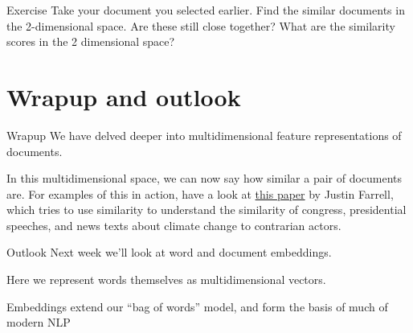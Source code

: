 \documentclass[
  10pt,
  ignorenonframetext,
  aspectratio=169]{beamer}
\newif\ifbibliography
\begin{document}
\begin{frame}{Exercise}
\protect\hypertarget{exercise-1}{}
Take your document you selected earlier. Find the similar documents in
the 2-dimensional space. Are these still close together? What are the
similarity scores in the 2 dimensional space?
\end{frame}

\hypertarget{wrapup-and-outlook}{%
\section{Wrapup and outlook}\label{wrapup-and-outlook}}

\begin{frame}{Wrapup}
\protect\hypertarget{wrapup}{}
We have delved deeper into multidimensional feature representations of
documents.

In this multidimensional space, we can now say how similar a pair of
documents are. For examples of this in action, have a look at
\href{https://static1.squarespace.com/static/5dc421b1359959419cd251d4/t/60186ce591c77159e8caa357/1612213506614/Farrell_NCC_Climate2016.pdf}{this
paper} by Justin Farrell, which tries to use similarity to understand
the similarity of congress, presidential speeches, and news texts about
climate change to contrarian actors.
\end{frame}

\begin{frame}{Outlook}
\protect\hypertarget{outlook}{}
Next week we'll look at word and document embeddings.

Here we represent words themselves as multidimensional vectors.

Embeddings extend our ``bag of words'' model, and form the basis of much
of modern NLP
\end{frame}

\begin{frame}[allowframebreaks]{}
  \bibliographytrue
  
\end{frame}
\end{document}
